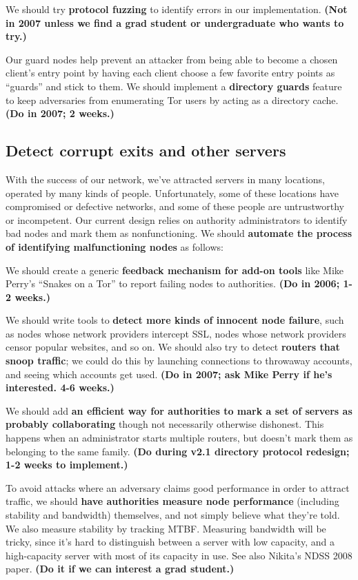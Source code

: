 \documentclass{article}
\newcommand{\plan}[1]{ {\bf (#1)}}
\begin{document}
We should try {\bf protocol fuzzing} to identify errors in our
implementation.\plan{Not in 2007 unless we find a grad student or
  undergraduate who wants to try.}

Our guard nodes help prevent an attacker from being able to become a chosen
client's entry point by having each client choose a few favorite entry points
as ``guards'' and stick to them.   We should implement a {\bf directory
  guards} feature to keep adversaries from enumerating Tor users by acting as
a directory cache.\plan{Do in 2007; 2 weeks.}

\subsection{Detect corrupt exits and other servers}
With the success of our network, we've attracted servers in many locations,
operated by many kinds of people.  Unfortunately, some of these locations
have compromised or defective networks, and some of these people are
untrustworthy or incompetent.  Our current design relies on authority
administrators to identify bad nodes and mark them as nonfunctioning.  We
should {\bf automate the process of identifying malfunctioning nodes} as
follows:

We should create a generic {\bf feedback mechanism for add-on tools} like
Mike Perry's ``Snakes on a Tor'' to report failing nodes to authorities.
\plan{Do in 2006; 1-2 weeks.}

We should write tools to {\bf detect more kinds of innocent node failure},
such as nodes whose network providers intercept SSL, nodes whose network
providers censor popular websites, and so on.  We should also try to detect
{\bf routers that snoop traffic}; we could do this by launching connections
to throwaway accounts, and seeing which accounts get used.\plan{Do in 2007;
  ask Mike Perry if he's interested.  4-6 weeks.}

We should add {\bf an efficient way for authorities to mark a set of servers
  as probably collaborating} though not necessarily otherwise dishonest.
This happens when an administrator starts multiple routers, but doesn't mark
them as belonging to the same family.\plan{Do during v2.1 directory protocol
  redesign; 1-2 weeks to implement.}

To avoid attacks where an adversary claims good performance in order to
attract traffic, we should {\bf have authorities measure node performance}
(including stability and bandwidth) themselves, and not simply believe what
they're told. We also measure stability by tracking MTBF.  Measuring
bandwidth will be tricky, since it's hard to distinguish between a server with
low capacity, and a high-capacity server with most of its capacity in
use. See also Nikita's NDSS 2008 paper.\plan{Do it if we can interest
a grad student.}
\end{document}
